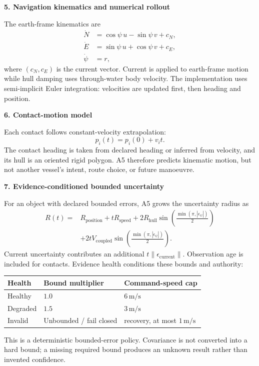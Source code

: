 \documentclass[10pt,a4paper]{article}
\newcommand{\sectionbar}[1]{%
  \vspace{4pt}%
  {\large\bfseries\color{hnavy}#1}\par
  \vspace{-2pt}{\color{hblue}\rule{\textwidth}{0.7pt}}\vspace{2pt}%
}
\begin{document}
\sectionbar{5. Navigation kinematics and numerical rollout}

The earth-frame kinematics are
\begin{align}
  \dot N &= \cos\psi\,u-\sin\psi\,v+c_N,\\
  \dot E &= \sin\psi\,u+\cos\psi\,v+c_E,\\
  \dot\psi &= r,
\end{align}
where $(c_N,c_E)$ is the current vector. Current is applied to earth-frame motion while hull damping uses through-water body velocity. The implementation uses semi-implicit Euler integration: velocities are updated first, then heading and position.

\sectionbar{6. Contact-motion model}

Each contact follows constant-velocity extrapolation:
\begin{equation}
  p_i(t)=p_i(0)+v_i t.
\end{equation}
The contact heading is taken from declared heading or inferred from velocity, and its hull is an oriented rigid polygon. A5 therefore predicts kinematic motion, but not another vessel's intent, route choice, or future manoeuvre.

\sectionbar{7. Evidence-conditioned bounded uncertainty}

For an object with declared bounded errors, A5 grows the uncertainty radius as
\begin{equation}
\begin{split}
  R(t)={}&R_{\mathrm{position}}+tR_{\mathrm{speed}}
  +2R_{\mathrm{hull}}\sin\left(\frac{\min(\pi,|\epsilon_\psi|)}{2}\right)\\
  &+2tV_{\mathrm{coupled}}\sin\left(\frac{\min(\pi,|\epsilon_\psi|)}{2}\right).
\end{split}
\end{equation}
Current uncertainty contributes an additional $t\|\epsilon_{\mathrm{current}}\|$. Observation age is included for contacts. Evidence health conditions these bounds and authority:
\begin{center}
\small
\begin{tabular}{@{}lll@{}}
\toprule
Health & Bound multiplier & Command-speed cap \\
\midrule
Healthy & $1.0$ & $6\,\mathrm{m/s}$ \\
Degraded & $1.5$ & $3\,\mathrm{m/s}$ \\
Invalid & Unbounded / fail closed & recovery, at most $1\,\mathrm{m/s}$ \\
\bottomrule
\end{tabular}
\end{center}
This is a deterministic bounded-error policy. Covariance is not converted into a hard bound; a missing required bound produces an unknown result rather than invented confidence.
\end{document}
